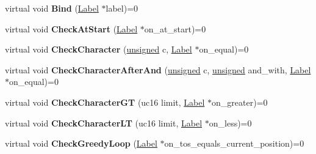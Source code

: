 \begin{DoxyCompactItemize}
virtual void {\bfseries Bind} (\mbox{\hyperlink{classv8_1_1internal_1_1Label}{Label}} $\ast$label)=0
\item 
\mbox{\label{classv8_1_1internal_1_1RegExpMacroAssembler_a5ecd7a813bf293dc9325c65840a2353b}} 
virtual void {\bfseries Check\+At\+Start} (\mbox{\hyperlink{classv8_1_1internal_1_1Label}{Label}} $\ast$on\+\_\+at\+\_\+start)=0
\item 
\mbox{\label{classv8_1_1internal_1_1RegExpMacroAssembler_a7d8a5cb9434ebe6a748b75bff7849eaa}} 
virtual void {\bfseries Check\+Character} (\mbox{\hyperlink{classunsigned}{unsigned}} c, \mbox{\hyperlink{classv8_1_1internal_1_1Label}{Label}} $\ast$on\+\_\+equal)=0
\item 
\mbox{\label{classv8_1_1internal_1_1RegExpMacroAssembler_a663101d81689ecee9375b9b2216b827b}} 
virtual void {\bfseries Check\+Character\+After\+And} (\mbox{\hyperlink{classunsigned}{unsigned}} c, \mbox{\hyperlink{classunsigned}{unsigned}} and\+\_\+with, \mbox{\hyperlink{classv8_1_1internal_1_1Label}{Label}} $\ast$on\+\_\+equal)=0
\item 
\mbox{\label{classv8_1_1internal_1_1RegExpMacroAssembler_a828b95b58f1f3173e5dcbd4268239bde}} 
virtual void {\bfseries Check\+Character\+GT} (uc16 limit, \mbox{\hyperlink{classv8_1_1internal_1_1Label}{Label}} $\ast$on\+\_\+greater)=0
\item 
\mbox{\label{classv8_1_1internal_1_1RegExpMacroAssembler_a6da6588d1142120898c35726d44ba28a}} 
virtual void {\bfseries Check\+Character\+LT} (uc16 limit, \mbox{\hyperlink{classv8_1_1internal_1_1Label}{Label}} $\ast$on\+\_\+less)=0
\item 
\mbox{\label{classv8_1_1internal_1_1RegExpMacroAssembler_abc266b4989f0c084987f50f20f1f3e23}} 
virtual void {\bfseries Check\+Greedy\+Loop} (\mbox{\hyperlink{classv8_1_1internal_1_1Label}{Label}} $\ast$on\+\_\+tos\+\_\+equals\+\_\+current\+\_\+position)=0
\item 
\mbox{\label{classv8_1_1internal_1_1RegExpMacroAssembler_a12b0a00f2d90487e6eccc9559f45a104}} 

\end{DoxyCompactItemize}
